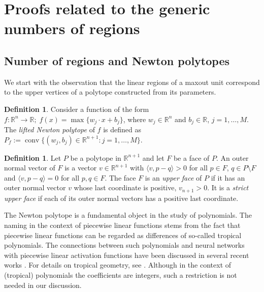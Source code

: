 \documentclass{article}
\theoremstyle{definition}
\newtheorem{definition}[theorem]{Definition}
\begin{document}
\section{Proofs related to the generic numbers of regions}
\label{app:posvol}

\subsection{Number of regions and Newton polytopes}
We start with the observation that the linear regions of a maxout unit correspond to the upper vertices of a polytope constructed from its parameters. 

\begin{definition}
\label{def:Newton-polytope}
Consider a function of the form $f \colon \mathbb{R}^n\to\mathbb{R};\; f(x) = \max\{w_j\cdot x + b_j\}$, 
where $w_j\in\mathbb{R}^n$ and $b_j\in \mathbb{R}$, $j=1,\ldots,M$. 
The \emph{lifted Newton polytope} of $f$ is defined as $P_f := \operatorname{conv}\{(w_j,b_j)\in\mathbb{R}^{n+1}\colon j=1,\ldots, M\}$.
\end{definition}

\begin{definition}
Let $P$ be a polytope in $\mathbb{R}^{n+1}$ and let $F$ be a face of $P$. 
An outer normal vector of $F$ is a vector $v\in\mathbb{R}^{n+1}$ with $\langle v, p-q \rangle > 0$ for all $p\in F$, $q\in P\setminus F$ and $\langle v, p-q \rangle = 0$ for all $p,q\in F$.
The face $F$ is an \emph{upper face} of $P$ if it has an outer normal vector $v$ whose last coordinate is positive, $v_{n+1}>0$.
It is a \emph{strict upper face} if each of its outer normal vectors has a positive last coordinate. 
\end{definition} 
The Newton polytope is a fundamental object in the study of polynomials. 
The naming in the context of piecewise linear functions stems from the fact that piecewise linear functions can be regarded as differences of so-called tropical polynomials. The connections between such polynomials and neural networks with piecewise linear activation functions have been discussed in several recent works \citep{zhang2018tropical,charisopoulos2018tropical,alfarra2020on}. 
For details on tropical geometry, see \citep{MaclaganSturmfels15,JoswigBook}. 
Although in the context of (tropical) polynomials the coefficients are integers, such a restriction is not needed in our discussion. 
\end{document}
